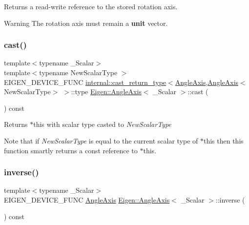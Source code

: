 \begin{DoxyReturn}{Returns}
a read-\/write reference to the stored rotation axis.
\end{DoxyReturn}
\begin{DoxyWarning}{Warning}
The rotation axis must remain a {\bfseries{unit}} vector. 
\end{DoxyWarning}
\mbox{\label{class_eigen_1_1_angle_axis_a4baeb843025af6b4ce76e9a29cc08988}} 
\subsubsection{\texorpdfstring{cast()}{cast()}}
{\footnotesize\ttfamily template$<$typename \+\_\+\+Scalar$>$ \\
template$<$typename New\+Scalar\+Type $>$ \\
E\+I\+G\+E\+N\+\_\+\+D\+E\+V\+I\+C\+E\+\_\+\+F\+U\+NC \mbox{\hyperlink{struct_eigen_1_1internal_1_1cast__return__type}{internal\+::cast\+\_\+return\+\_\+type}}$<$\mbox{\hyperlink{class_eigen_1_1_angle_axis}{Angle\+Axis}},\mbox{\hyperlink{class_eigen_1_1_angle_axis}{Angle\+Axis}}$<$New\+Scalar\+Type$>$ $>$\+::type \mbox{\hyperlink{class_eigen_1_1_angle_axis}{Eigen\+::\+Angle\+Axis}}$<$ \+\_\+\+Scalar $>$\+::cast (\begin{DoxyParamCaption}{ }\end{DoxyParamCaption}) const\hspace{0.3cm}{\ttfamily [inline]}}

\begin{DoxyReturn}{Returns}
{\ttfamily $\ast$this} with scalar type casted to {\itshape New\+Scalar\+Type} 
\end{DoxyReturn}
Note that if {\itshape New\+Scalar\+Type} is equal to the current scalar type of {\ttfamily $\ast$this} then this function smartly returns a const reference to {\ttfamily $\ast$this}. \mbox{\label{class_eigen_1_1_angle_axis_a915c92f43b1a6103762d0d0d059748fb}} 
\subsubsection{\texorpdfstring{inverse()}{inverse()}}
{\footnotesize\ttfamily template$<$typename \+\_\+\+Scalar$>$ \\
E\+I\+G\+E\+N\+\_\+\+D\+E\+V\+I\+C\+E\+\_\+\+F\+U\+NC \mbox{\hyperlink{class_eigen_1_1_angle_axis}{Angle\+Axis}} \mbox{\hyperlink{class_eigen_1_1_angle_axis}{Eigen\+::\+Angle\+Axis}}$<$ \+\_\+\+Scalar $>$\+::inverse (\begin{DoxyParamCaption}{ }\end{DoxyParamCaption}) const\hspace{0.3cm}{\ttfamily [inline]}}

